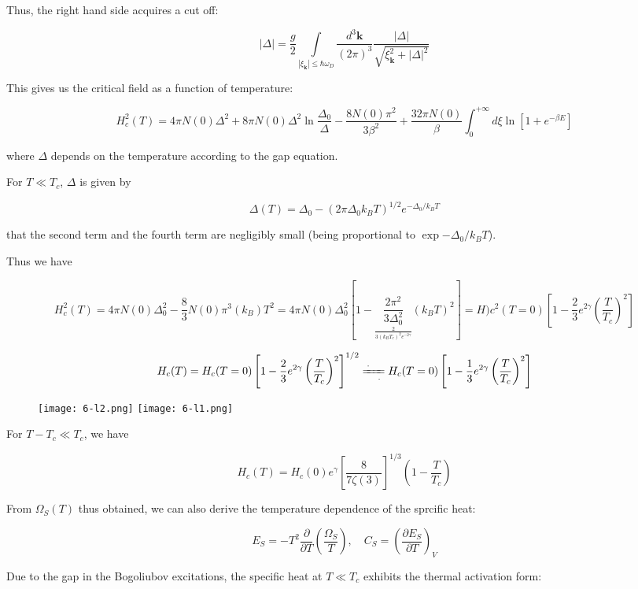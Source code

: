 ﻿\documentclass[twoside]{book}
\newcommand{\deq}{\xlongequal[\ \ \ \cdot]{\cdot\ \ \ }}
\numberwithin{equation}{section}
\begin{document}
Thus, the right hand side acquires a cut off:

\[|\Delta|=\frac{g}{2}\underset{|\xi_{\bm{k}}|\le\hbar\omega_D}{\int}\frac{d^3 \bm{k}}{(2\pi)^3}\frac{|\Delta|}{\sqrt{\xi_{\bm{k}}^2+|\Delta|^2}} \]%




This gives us the critical field as a function of temperature:

\[H_c^2(T) = 4\pi N(0)\Delta^2+8\pi N(0)\Delta^2\ln\frac{\Delta_0}{\Delta} - \frac{8N(0)\pi^2}{3\beta^2}+\frac{32\pi N(0)}{\beta}\int_0^{+\infty}d\xi\ln[1+e^{-\beta E}] \]

where $\Delta$ depends on the temperature according to the gap equation. 

For $T\ll T_c$, $\Delta$ is given by 

\[\Delta(T) =\Delta_0-(2\pi\Delta_0 k_BT)^{1/2}e^{-\Delta_0/k_BT} \]

that the second term and the fourth term are negligibly small (being proportional to $\exp{-\Delta_0/k_BT}$). 

Thus we have

\[H_c^2(T) = 4\pi N(0)\Delta_0^2-\frac{8}{3}N(0)\pi^3 (k_B)T^2  = 4\pi N(0)\Delta_0^2\left[1 - \underset{\frac{2}{3(k_BT_c)^2 e^{-2\gamma}}}{\frac{2\pi^2}{3\Delta_0^2}}(k_BT)^2\right] = H)c^2(T=0)\left[ 1 - \frac{2}{3} e^{2\gamma}\left(\frac{T}{T_c}\right)^2\right]\]

\[H_c(T) = H_c(T=0)\left[ 1 - \frac{2}{3} e^{2\gamma}\left(\frac{T}{T_c}\right)^2\right]^{1/2} \deq H_c(T=0)\left[ 1 - \frac{1}{3} e^{2\gamma}\left(\frac{T}{T_c}\right)^2\right] \]

\begin{wrapfigure}{l}{6cm}
\texttt{[image: 6-l2.png]}
\texttt{[image: 6-l1.png]}
\end{wrapfigure}



For $T-T_c\ll T_c$, we have

\[H_c(T)=H_c(0)e^\gamma \left[\frac{8}{7\zeta(3)}\right]^{1/3}\left(1-\frac{T}{T_c}\right) \]

From $\Omega_S(T)$ thus obtained, we can also derive the temperature dependence of the sprcific heat:

\[E_S=-T^2\frac{\partial}{\partial T}\left(\frac{\Omega_S}{T}\right),\quad C_S=\left(\frac{\partial E_S}{\partial T}\right)_V \]

Due to the gap in the Bogoliubov excitations, the specific heat at $T\ll T_c$ exhibits the thermal activation form:
\end{document}
